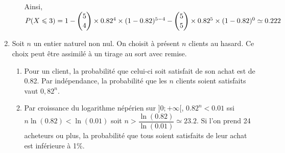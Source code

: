 \documentclass[11pt,fleqn, openany]{book} %
\begin{document}
\begin{solution}
\begin{enumerate}
\begin{enumerate}
Ainsi, $P(X \leqslant 3)=1- \dbinom{5}{4}\times 0.82^4 \times (1-0.82)^{5-4} - \dbinom{5}{5} \times 0.82^5 \times (1-0.82)^0 \simeq 0.222$
\end{enumerate}
\item Soit $n$ un entier naturel non nul. On choisit à présent $n$ clients au hasard. Ce choix peut être assimilé à un tirage au sort avec
remise.
\begin{enumerate}
\item Pour un client, la probabilité que celui-ci soit satisfait de son achat est de 0.82. Par indépendance, la probabilité que les $n$ clients soient satisfaits vaut $0,82^n$.
\item Par croissance du logarithme népérien sur $]0;+\infty[$, $0.82^n < 0.01$ ssi $n\ln(0.82)< \ln(0.01)$ soit $n> \dfrac{\ln(0.82)}{\ln(0.01)} \simeq 23.2$. Si l'on prend 24 acheteurs ou plus, la probabilité que tous soient satisfaits de leur achat est inférieure à 1\%.
\end{enumerate}
\end{enumerate}
\end{solution}
\end{document}

